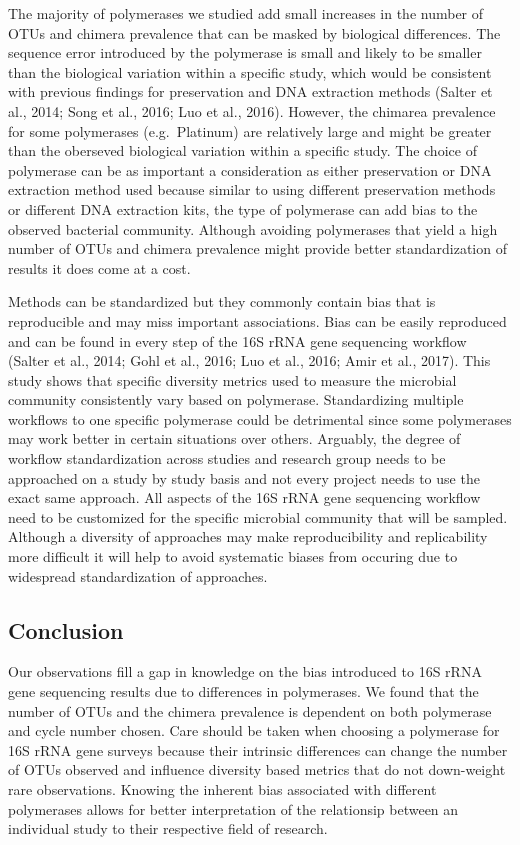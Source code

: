 \documentclass[12pt,]{article}
\begin{document}
The majority of polymerases we studied add small increases in the number
of OTUs and chimera prevalence that can be masked by biological
differences. The sequence error introduced by the polymerase is small
and likely to be smaller than the biological variation within a specific
study, which would be consistent with previous findings for preservation
and DNA extraction methods (Salter et al., 2014; Song et al., 2016; Luo
et al., 2016). However, the chimarea prevalence for some polymerases
(e.g.~Platinum) are relatively large and might be greater than the
oberseved biological variation within a specific study. The choice of
polymerase can be as important a consideration as either preservation or
DNA extraction method used because similar to using different
preservation methods or different DNA extraction kits, the type of
polymerase can add bias to the observed bacterial community. Although
avoiding polymerases that yield a high number of OTUs and chimera
prevalence might provide better standardization of results it does come
at a cost.

Methods can be standardized but they commonly contain bias that is
reproducible and may miss important associations. Bias can be easily
reproduced and can be found in every step of the 16S rRNA gene
sequencing workflow (Salter et al., 2014; Gohl et al., 2016; Luo et al.,
2016; Amir et al., 2017). This study shows that specific diversity
metrics used to measure the microbial community consistently vary based
on polymerase. Standardizing multiple workflows to one specific
polymerase could be detrimental since some polymerases may work better
in certain situations over others. Arguably, the degree of workflow
standardization across studies and research group needs to be approached
on a study by study basis and not every project needs to use the exact
same approach. All aspects of the 16S rRNA gene sequencing workflow need
to be customized for the specific microbial community that will be
sampled. Although a diversity of approaches may make reproducibility and
replicability more difficult it will help to avoid systematic biases
from occuring due to widespread standardization of approaches.

\newpage

\subsection{Conclusion}\label{conclusion}

Our observations fill a gap in knowledge on the bias introduced to 16S
rRNA gene sequencing results due to differences in polymerases. We found
that the number of OTUs and the chimera prevalence is dependent on both
polymerase and cycle number chosen. Care should be taken when choosing a
polymerase for 16S rRNA gene surveys because their intrinsic differences
can change the number of OTUs observed and influence diversity based
metrics that do not down-weight rare observations. Knowing the inherent
bias associated with different polymerases allows for better
interpretation of the relationsip between an individual study to their
respective field of research.
\end{document}
